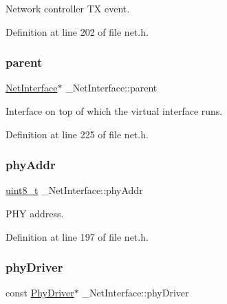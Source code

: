 Network controller TX event. 



Definition at line 202 of file net.\+h.

\mbox{\label{struct__NetInterface_ac581ac09560df4994af65724cb821c2f}} 
\subsubsection{\texorpdfstring{parent}{parent}}
{\footnotesize\ttfamily \hyperlink{net_8h_a2234db8911a1148c9159979d8f5e0d6b}{Net\+Interface}$\ast$ \+\_\+\+Net\+Interface\+::parent}



Interface on top of which the virtual interface runs. 



Definition at line 225 of file net.\+h.

\mbox{\label{struct__NetInterface_aebf24765c4ba138f7b8fc34e5fad093f}} 
\subsubsection{\texorpdfstring{phy\+Addr}{phyAddr}}
{\footnotesize\ttfamily \hyperlink{stdint_8h_aba7bc1797add20fe3efdf37ced1182c5}{uint8\+\_\+t} \+\_\+\+Net\+Interface\+::phy\+Addr}



P\+HY address. 



Definition at line 197 of file net.\+h.

\mbox{\label{struct__NetInterface_a9f31014c24e11e57940f15a3a8a46006}} 
\subsubsection{\texorpdfstring{phy\+Driver}{phyDriver}}
{\footnotesize\ttfamily const \hyperlink{structPhyDriver}{Phy\+Driver}$\ast$ \+\_\+\+Net\+Interface\+::phy\+Driver}



